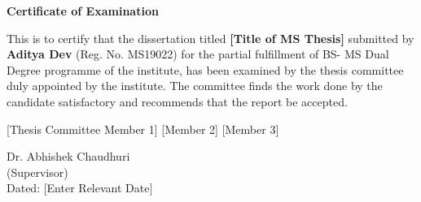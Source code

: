 \begin{center}
    \textbf{\Large Certificate of Examination}
\end{center}

This is to certify that the dissertation titled \textbf{[Title of MS Thesis]} submitted by 
\textbf{Aditya Dev} (Reg. No. MS19022) for the partial fulfillment of BS- MS Dual Degree 
programme of the institute, has been examined by the thesis committee duly appointed by the 
institute. The committee finds the work done by the candidate satisfactory and recommends 
that the report be accepted.

\vspace{4cm}

[Thesis Committee Member 1] \hspace{1.5cm} [Member 2] \hspace{1.5cm} [Member 3]

\vspace{4cm}

\begin{flushright}
    Dr. Abhishek Chaudhuri
    \\
    (Supervisor)
    \\
    \vspace{4cm}
    Dated: [Enter Relevant Date]
\end{flushright}